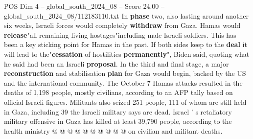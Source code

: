 \begin{textsample}{POS Dim 4 – global\_south\_2024\_08 – Score 24.00 – global\_south\_2024\_08/112183110.txt}
In \textbf{phase} two, also lasting around another six weeks, Israeli forces would completely \textbf{withdraw} from Gaza.
Hamas would \textbf{release}"all remaining living hostages"including male Israeli soldiers.
This has been a key sticking point for Hamas in the past.
If both sides keep to the \textbf{deal} it will lead to the"\textbf{cessation} of hostilities \textbf{permanently}", Biden said, quoting what he said had been an Israeli \textbf{proposal}.
In the third and final stage, a major \textbf{reconstruction} and stabilisation \textbf{plan} for Gaza would begin, backed by the US and the international community.
The October 7 Hamas attacks resulted in the deaths of 1,198 people, mostly civilians, according to an AFP tally based on official Israeli figures.
Militants also seized 251 people, 111 of whom are still held in Gaza, including 39 the Israeli military says are dead.
Israel ' s retaliatory military offensive in Gaza has killed at least 39,790 people, according to the health ministry @ @ @ @ @ @ @ @ @ @ on civilian and militant deaths.

\end{textsample}
